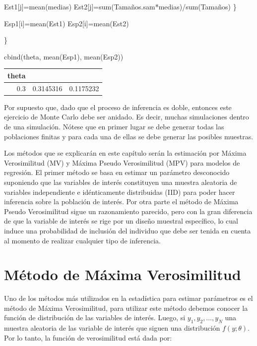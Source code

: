 \documentclass[
  12pt,
]{book}
\newenvironment{Shaded}{\begin{snugshade}}{\end{snugshade}}
\newcommand{\FunctionTok}[1]{\textcolor[rgb]{0.00,0.00,0.00}{#1}}
\newcommand{\NormalTok}[1]{#1}
\newcommand{\OtherTok}[1]{\textcolor[rgb]{0.56,0.35,0.01}{#1}}
\newcommand{\SpecialCharTok}[1]{\textcolor[rgb]{0.00,0.00,0.00}{#1}}
\begin{document}
\begin{Shaded}
\begin{Highlighting}[]
\NormalTok{Est1[j]}\OtherTok{=}\FunctionTok{mean}\NormalTok{(medias)}
\NormalTok{Est2[j]}\OtherTok{=}\FunctionTok{sum}\NormalTok{(Tamaños.sam}\SpecialCharTok{*}\NormalTok{medias)}\SpecialCharTok{/}\FunctionTok{sum}\NormalTok{(Tamaños)}
\NormalTok{\}}

\NormalTok{Esp1[i]}\OtherTok{=}\FunctionTok{mean}\NormalTok{(Est1)}
\NormalTok{Esp2[i]}\OtherTok{=}\FunctionTok{mean}\NormalTok{(Est2)}

\NormalTok{\}}

\FunctionTok{cbind}\NormalTok{(theta, }\FunctionTok{mean}\NormalTok{(Esp1), }\FunctionTok{mean}\NormalTok{(Esp2))}
\end{Highlighting}
\end{Shaded}

\begin{tabular}{r|r|r}
\hline
theta &  & \\
\hline
0.3 & 0.3145316 & 0.1175232\\
\hline
\end{tabular}

Por supuesto que, dado que el proceso de inferencia es doble, entonces este ejercicio de Monte Carlo debe ser anidado. Es decir, muchas simulaciones dentro de una simulación. Nótese que en primer lugar se debe generar todas las poblaciones finitas y para cada una de ellas se debe generar las posibles muestras.

Los métodos que se explicarán en este capítulo serán la estimación por Máxima Verosimilitud (MV) y Máxima Pseudo Verosimilitud (MPV) para modelos de regresión. El primer método se basa en estimar un parámetro desconocido suponiendo que las variables de interés constituyen una muestra aleatoria de variables independiente e idénticamente distribuidas (IID) para poder hacer inferencia sobre la población de interés. Por otra parte el método de Máxima Pseudo Verosimilitud sigue un razonamiento parecido, pero con la gran diferencia de que la variable de interés se rige por un diseño muestral específico, lo cual induce una probabilidad de inclusión del individuo que debe ser tenida en cuenta al momento de realizar cualquier tipo de inferencia.

\hypertarget{muxe9todo-de-muxe1xima-verosimilitud}{%
\section{Método de Máxima Verosimilitud}\label{muxe9todo-de-muxe1xima-verosimilitud}}

Uno de los métodos más utilizados en la estadística para estimar parámetros es el método de Máxima Verosimilitud, para utilizar este método debemos conocer la función de distribución de las variables de interés. Luego, si \(y_{1},y_{2},\ldots,y_{N}\) una muestra aleatoria de las variable de interés que siguen una distribución \(f(y;\theta)\). Por lo tanto, la función de verosimilitud está dada por:
\end{document}
